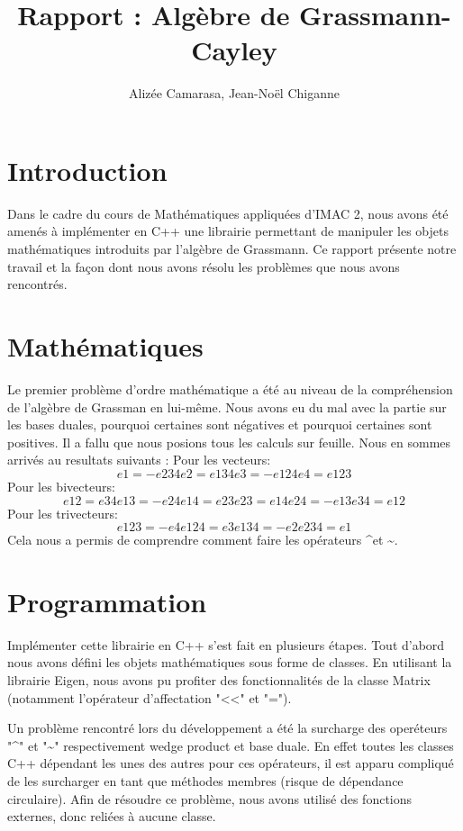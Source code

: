 \documentclass[12pt]{article}
\begin{document}
\pagestyle{headings}

\title{Rapport : Algèbre de Grassmann-Cayley}
\author{Alizée Camarasa, Jean-Noël Chiganne}
\maketitle
\newpage
\tableofcontents

\newpage
\section{Introduction}
Dans le cadre du cours de Mathématiques appliquées d'IMAC 2, nous avons été amenés à implémenter en C++ une librairie permettant de manipuler les objets mathématiques introduits par l'algèbre de Grassmann.
Ce rapport présente notre travail et la façon dont nous avons résolu les problèmes que nous avons rencontrés.


\newpage

\section{Mathématiques}
Le premier problème d’ordre mathématique a été au niveau de la compréhension de l’algèbre de Grassman en lui-même. Nous avons eu du mal avec la partie sur les bases duales, pourquoi certaines sont négatives et pourquoi certaines sont positives. Il a fallu que nous posions tous les calculs sur feuille. Nous en sommes arrivés au resultats suivants : 
\newline Pour les vecteurs: 
$$e1=-e234 e2=e134 e3=-e124 e4=e123$$ 
Pour les bivecteurs:
$$e12=e34 e13=-e24 e14=e23 e23=e14 e24=-e13 e34=e12$$
Pour les trivecteurs: 
$$e123=-e4 e124=e3 e134=-e2 e234=e1$$
Cela nous a permis de comprendre comment faire les opérateurs \textasciicircum  et \textasciitilde.


\section{Programmation}
Implémenter cette librairie en C++ s'est fait en plusieurs étapes. Tout d'abord nous avons défini les objets mathématiques sous forme de classes.
En utilisant la librairie Eigen, nous avons pu profiter des fonctionnalités de la classe Matrix (notamment l'opérateur d'affectation "<<" et "=").

Un problème rencontré lors du développement a été la surcharge des operéteurs "\textasciicircum" et "\textasciitilde" respectivement wedge product et base duale.
En effet toutes les classes C++ dépendant les unes des autres pour ces opérateurs, il est apparu compliqué de les surcharger en tant que méthodes membres (risque de dépendance circulaire).
Afin de résoudre ce problème, nous avons utilisé des fonctions externes, donc reliées à aucune classe.
\end{document}
